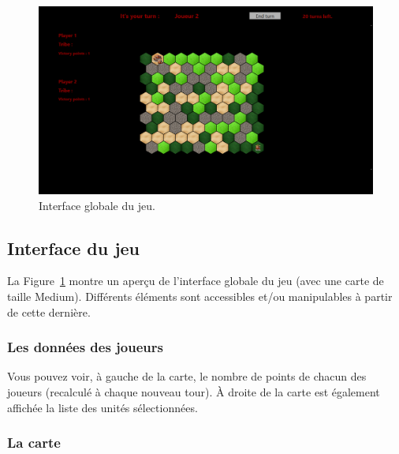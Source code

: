 \begin{landscape}
    \begin{figure}[!h]
    \centering
    \includegraphics[height=0.90\textwidth]{figure/game.png}
    \caption{Interface globale du jeu.}
    \label{fig:game}
    \end{figure}
\end{landscape}

\subsection{Interface du jeu}

La {\sc Figure}~\ref{fig:game} montre un aperçu de l'interface globale du jeu (avec une carte de taille Medium). Différents éléments sont accessibles et/ou manipulables à partir de cette dernière.

\subsubsection{Les données des joueurs}

Vous pouvez voir, à gauche de la carte, le nombre de points de chacun des joueurs (recalculé à chaque nouveau tour). À droite de la carte est également affichée la liste des unités sélectionnées. 

\subsubsection{La carte}

